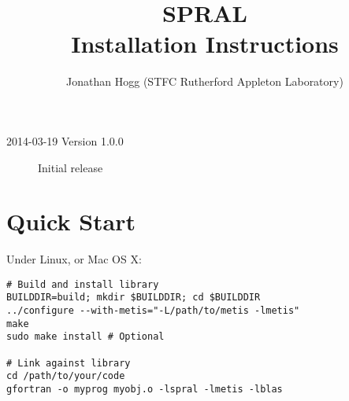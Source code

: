 
\title{SPRAL \\Installation Instructions}
\author{Jonathan Hogg (STFC Rutherford Appleton Laboratory)}
\makeinstalltitle
\thispagestyle{firststyle}

\versionhistory
\begin{description}
\item[2014-03-19 Version 1.0.0] Initial release
\end{description}


\section{Quick Start}

Under Linux, or Mac OS X:

\begin{verbatim}
# Build and install library
BUILDDIR=build; mkdir $BUILDDIR; cd $BUILDDIR
../configure --with-metis="-L/path/to/metis -lmetis"
make
sudo make install # Optional

# Link against library
cd /path/to/your/code
gfortran -o myprog myobj.o -lspral -lmetis -lblas
\end{verbatim}

